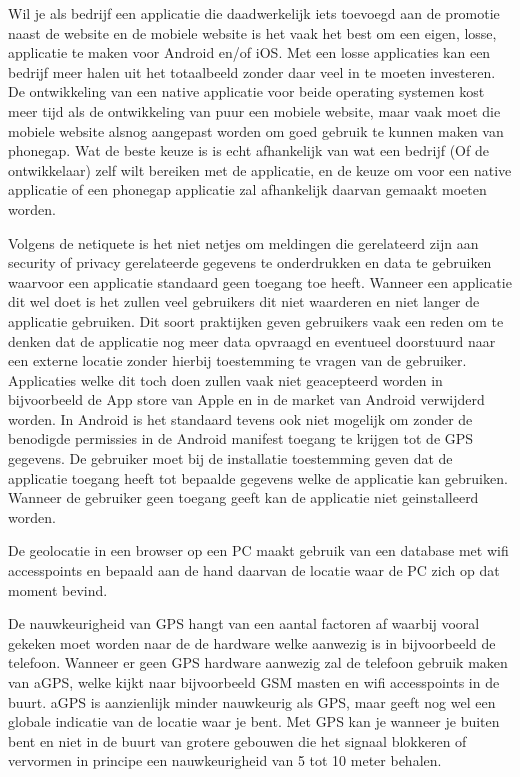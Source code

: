 Wil je als bedrijf een applicatie die daadwerkelijk iets toevoegd aan de promotie naast de website en de mobiele website is het vaak het best om een eigen, losse, applicatie te maken voor Android en/of iOS. Met een losse applicaties kan een bedrijf meer halen uit het totaalbeeld zonder daar veel in te moeten investeren. De ontwikkeling van een native applicatie voor beide operating systemen kost meer tijd als de ontwikkeling van puur een mobiele website, maar vaak moet die mobiele website alsnog aangepast worden om goed gebruik te kunnen maken van phonegap. 
Wat de beste keuze is is echt afhankelijk van wat een bedrijf (Of de ontwikkelaar) zelf wilt bereiken met de applicatie, en de keuze om voor een native applicatie of een phonegap applicatie zal afhankelijk daarvan gemaakt moeten worden.

Volgens de netiquete is het niet netjes om meldingen die gerelateerd zijn aan security of privacy gerelateerde gegevens te onderdrukken en data te gebruiken waarvoor een applicatie standaard geen toegang toe heeft. Wanneer een applicatie dit wel doet is het zullen veel gebruikers dit niet waarderen en niet langer de applicatie gebruiken. Dit soort praktijken geven gebruikers vaak een reden om te denken dat de applicatie nog meer data opvraagd en eventueel doorstuurd naar een externe locatie zonder hierbij toestemming te vragen van de gebruiker. Applicaties welke dit toch doen zullen vaak niet geacepteerd worden in bijvoorbeeld de App store van Apple en in de market van Android verwijderd worden. 
In Android is het standaard tevens ook niet mogelijk om zonder de benodigde permissies in de Android manifest toegang te krijgen tot de GPS gegevens. De gebruiker moet bij de installatie toestemming geven dat de applicatie toegang heeft tot bepaalde gegevens welke de applicatie kan gebruiken. Wanneer de gebruiker geen toegang geeft kan de applicatie niet geinstalleerd worden.

De geolocatie in een browser op een PC maakt gebruik van een database met wifi accesspoints en bepaald aan de hand daarvan de locatie waar de PC zich op dat moment bevind.

De nauwkeurigheid van GPS hangt van een aantal factoren af waarbij vooral gekeken moet worden naar de de hardware welke aanwezig is in bijvoorbeeld de telefoon. Wanneer er geen GPS hardware aanwezig zal de telefoon gebruik maken van aGPS, welke kijkt naar bijvoorbeeld GSM masten en wifi accesspoints in de buurt. aGPS is aanzienlijk minder nauwkeurig als GPS, maar geeft nog wel een globale indicatie van de locatie waar je bent. Met GPS kan je wanneer je buiten bent en niet in de buurt van grotere gebouwen die het signaal blokkeren of vervormen in principe een nauwkeurigheid van 5 tot 10 meter behalen. 

